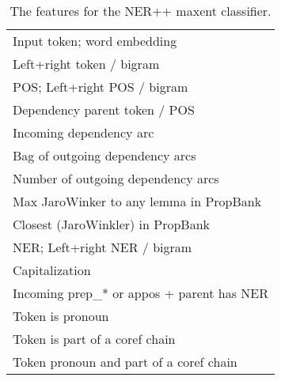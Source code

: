 \documentclass[11pt]{article}
\newcommand\w[1]{\textit{#1}} %
\begin{document}




%
%

\begin{table}[t]
\small
\begin{center}
\begin{tabular}{l}
Input token; word embedding                  \\
Left+right token / bigram                    \\
POS; Left+right POS / bigram                 \\
Dependency parent token / POS                \\
Incoming dependency arc                      \\
Bag of outgoing dependency arcs              \\
Number of outgoing dependency arcs           \\
Max JaroWinker to any lemma in PropBank      \\
Closest (JaroWinkler) in PropBank \todo{???} \\
NER; Left+right NER / bigram                 \\
Capitalization                               \\
Incoming prep\_* or appos + parent has NER   \\
Token is pronoun                             \\
Token is part of a coref chain               \\
Token pronoun and part of a coref chain     \\
\end{tabular}
\end{center}
\caption{\label{tab:features} The features for the NER++ maxent classifier. }
\end{table}
\end{document}
